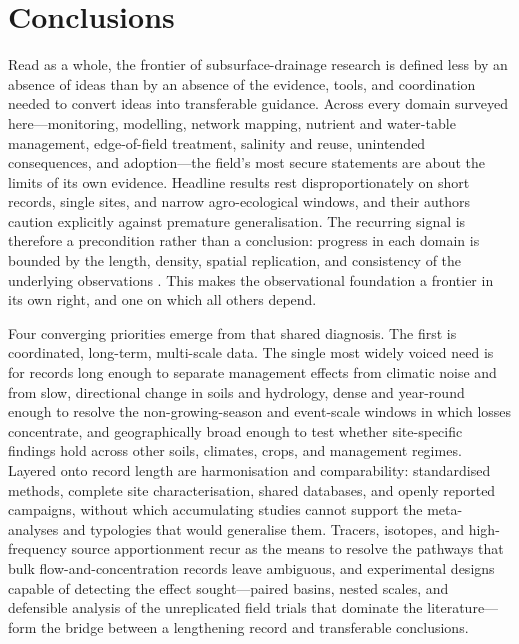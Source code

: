 \section{Conclusions}

Read as a whole, the frontier of subsurface-drainage research is defined
less by an absence of ideas than by an absence of the evidence, tools, and
coordination needed to convert ideas into transferable guidance. Across
every domain surveyed here---monitoring, modelling, network mapping,
nutrient and water-table management, edge-of-field treatment, salinity and
reuse, unintended consequences, and adoption---the field's most secure
statements are about the limits of its own evidence. Headline results rest
disproportionately on short records, single sites, and narrow
agro-ecological windows, and their authors caution explicitly against
premature generalisation. The recurring signal is therefore a precondition
rather than a conclusion: progress in each domain is bounded by the length,
density, spatial replication, and consistency of the underlying
observations \parencite{Rogger2017,Kladivko2001}. This makes the observational foundation a frontier in its own
right, and one on which all others depend.

Four converging priorities emerge from that shared diagnosis. The first is
coordinated, long-term, multi-scale data. The single most widely voiced need
is for records long enough to separate management effects from climatic
noise and from slow, directional change in soils and hydrology, dense and
year-round enough to resolve the non-growing-season and event-scale windows
in which losses concentrate, and geographically broad enough to test whether
site-specific findings hold across other soils, climates, crops, and
management regimes. Layered onto record length are harmonisation and
comparability: standardised methods, complete site characterisation,
shared databases, and openly reported campaigns, without which accumulating
studies cannot support the meta-analyses and typologies that would
generalise them. Tracers, isotopes, and high-frequency source
apportionment recur as the means to resolve the pathways that bulk
flow-and-concentration records leave ambiguous, and experimental designs
capable of detecting the effect sought---paired basins, nested scales,
and defensible analysis of the unreplicated field trials that dominate the
literature---form the bridge between a lengthening record and transferable
conclusions.

